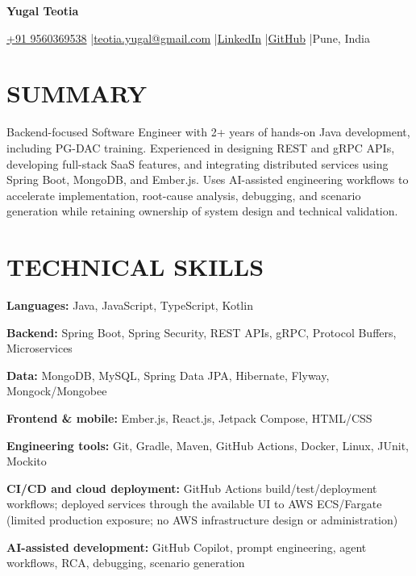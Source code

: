 \documentclass[a4paper,10pt]{article}
\begin{document}
{\centering
{\fontsize{19}{22}\selectfont\bfseries Yugal Teotia}\par
\vspace{5pt}
{\small \href{tel:+919560369538}{+91 9560369538} \enspace|\enspace \href{mailto:teotia.yugal@gmail.com}{teotia.yugal@gmail.com} \enspace|\enspace \href{https://www.linkedin.com/in/yugalteotia/}{LinkedIn} \enspace|\enspace \href{https://github.com/yugalteotia}{GitHub} \enspace|\enspace Pune, India}\par
}

\section{SUMMARY}
Backend-focused Software Engineer with 2+ years of hands-on Java development, including PG-DAC training. Experienced in designing REST and gRPC APIs, developing full-stack SaaS features, and integrating distributed services using Spring Boot, MongoDB, and Ember.js. Uses AI-assisted engineering workflows to accelerate implementation, root-cause analysis, debugging, and scenario generation while retaining ownership of system design and technical validation.

\section{TECHNICAL SKILLS}
\textbf{Languages:} Java, JavaScript, TypeScript, Kotlin\par\vspace{2pt}
\textbf{Backend:} Spring Boot, Spring Security, REST APIs, gRPC, Protocol Buffers, Microservices\par\vspace{2pt}
\textbf{Data:} MongoDB, MySQL, Spring Data JPA, Hibernate, Flyway, Mongock/Mongobee\par\vspace{2pt}
\textbf{Frontend \& mobile:} Ember.js, React.js, Jetpack Compose, HTML/CSS\par\vspace{2pt}
\textbf{Engineering tools:} Git, Gradle, Maven, GitHub Actions, Docker, Linux, JUnit, Mockito\par\vspace{2pt}
\textbf{CI/CD and cloud deployment:} GitHub Actions build/test/deployment workflows; deployed services through the available UI to AWS ECS/Fargate (limited production exposure; no AWS infrastructure design or administration)\par\vspace{2pt}
\textbf{AI-assisted development:} GitHub Copilot, prompt engineering, agent workflows, RCA, debugging, scenario generation
\end{document}
